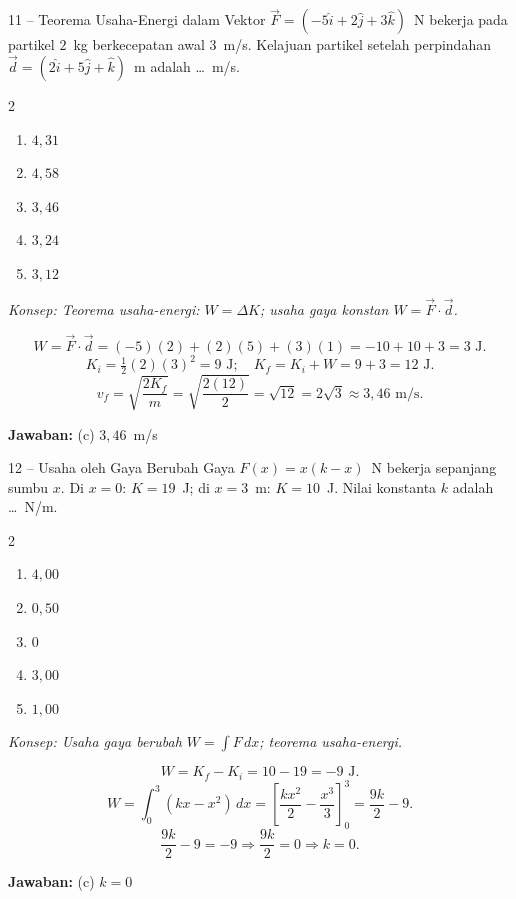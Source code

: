 \documentclass[11pt]{article}
\newcommand{\jawaban}[1]{%
  \noindent\colorbox{gold!30}{\parbox{\dimexpr\linewidth-2\fboxsep\relax}{%
    \textbf{Jawaban:} #1}}\par\smallskip}
\newcommand{\konsep}[1]{\textit{Konsep: #1.}\par\smallskip}
\newenvironment{pilB}{%
  \par\smallskip\begin{multicols}{2}
  \begin{enumerate}[label=(\alph*),leftmargin=*,itemsep=1pt,topsep=3pt]}%
  {\end{enumerate}\end{multicols}}
\begin{document}
\begin{soal}{11 -- Teorema Usaha-Energi dalam Vektor}
$\vec{F}=(-5\hat{i}+2\hat{j}+3\hat{k})$~N bekerja pada partikel $2$~kg berkecepatan awal
$3$~m/s. Kelajuan partikel setelah perpindahan $\vec{d}=(2\hat{i}+5\hat{j}+\hat{k})$~m
adalah \ldots~m/s.
\begin{pilB}
  \item $4{,}31$ \item $4{,}58$ \item $3{,}46$ \item $3{,}24$ \item $3{,}12$
\end{pilB}
\end{soal}
\begin{pembox}
\konsep{Teorema usaha-energi: $W=\Delta K$; usaha gaya konstan $W=\vec{F}\cdot\vec{d}$}
\[
W = \vec{F}\cdot\vec{d} = (-5)(2)+(2)(5)+(3)(1) = -10+10+3 = 3\text{ J}.
\]
\[
K_i = \tfrac{1}{2}(2)(3)^2 = 9\text{ J};\quad K_f = K_i + W = 9+3 = 12\text{ J}.
\]
\[
v_f = \sqrt{\frac{2K_f}{m}} = \sqrt{\frac{2(12)}{2}} = \sqrt{12} = 2\sqrt{3} \approx 3{,}46\text{ m/s}.
\]
\jawaban{(c) $3{,}46$~m/s}
\end{pembox}

\begin{soal}{12 -- Usaha oleh Gaya Berubah}
Gaya $F(x)=x(k-x)$~N bekerja sepanjang sumbu $x$. Di $x=0$: $K=19$~J; di $x=3$~m:
$K=10$~J. Nilai konstanta $k$ adalah \ldots~N/m.
\begin{pilB}
  \item $4{,}00$ \item $0{,}50$ \item $0$ \item $3{,}00$ \item $1{,}00$
\end{pilB}
\end{soal}
\begin{pembox}
\konsep{Usaha gaya berubah $W=\int F\,dx$; teorema usaha-energi}
\[
W = K_f - K_i = 10 - 19 = -9\text{ J}.
\]
\[
W = \int_0^3(kx-x^2)\,dx = \left[\frac{kx^2}{2}-\frac{x^3}{3}\right]_0^3 = \frac{9k}{2} - 9.
\]
\[
\frac{9k}{2} - 9 = -9 \Rightarrow \frac{9k}{2} = 0 \Rightarrow k = 0.
\]
\jawaban{(c) $k=0$}
\end{pembox}
\end{document}

